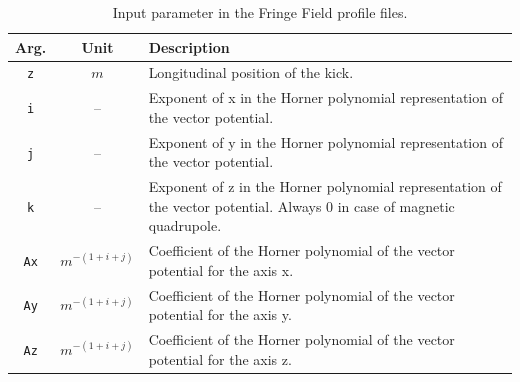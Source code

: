 \begin{center}
\begin{longtable}{|c|c|p{11cm}|}
    \caption{Input parameter in the Fringe Field profile files.}
    \label{tab:ffield_file} \\*
    \hline
    \rowcolor{blue!30}
    Arg. & Unit & Description \\*
    \hline
    \endfirsthead

    \texttt{z} & $m$ & Longitudinal position of the kick. \\*
    \hline

    \texttt{i} & -- & Exponent of x in the Horner polynomial representation of the vector potential.  \\*
    \hline

    \texttt{j} & -- & Exponent of y in the Horner polynomial representation of the vector potential. \\*
    \hline

    \texttt{k} & -- & Exponent of z in the Horner polynomial representation of the vector potential. Always 0 in case of magnetic quadrupole. \\*
    \hline

    \texttt{Ax} & $m^{-(1+i+j)}$ & Coefficient of the Horner polynomial of the vector potential for the axis x. \\*
    \hline

    \texttt{Ay} & $m^{-(1+i+j)}$ & Coefficient of the Horner polynomial of the vector potential for the axis y. \\*
    \hline

    \texttt{Az} & $m^{-(1+i+j)}$ & Coefficient of the Horner polynomial of the vector potential for the axis z. \\*
    \hline

\end{longtable}
\end{center}
